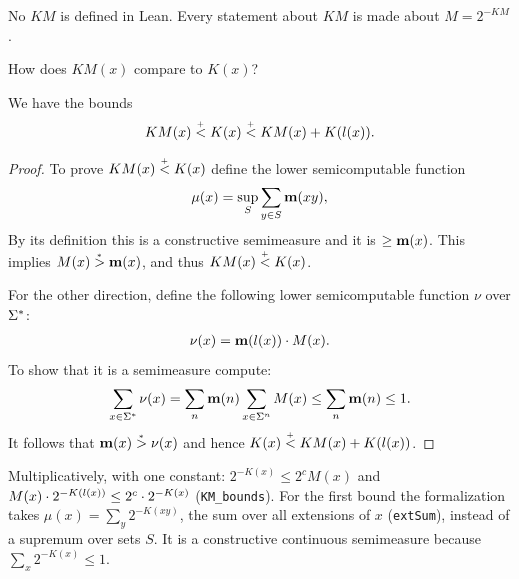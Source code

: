 \begin{formalization}
No \( KM \) is defined in Lean. Every statement about \( KM \) is made about
\( M = 2^{-KM} \).
\end{formalization}

How does \( KM(x) \) compare to \( K(x) \)?

\begin{proposition}\label{prop:KmHCompare}
  \leanok
We have the bounds
 \begin{align*}
 KM(x) \stackrel{{}_+}{<} K(x) \stackrel{{}_+}{<} KM(x) + K(l(x)).
 \end{align*}
\end{proposition}
\begin{proof}
  \leanok
To prove \( KM(x)\stackrel{{}_+}{<} K(x) \) define the lower semicomputable function
 \begin{align*}
   \mu(x) = \sup_{S}\sum_{y\in S}\mathbf{m}(xy),
 \end{align*}
By its definition this is a constructive semimeasure and it is
\( \ge \mathbf{m}(x) \).
This implies \( M(x)\stackrel{{}_*}{>} \mathbf{m}(x) \), and thus \( KM(x)\stackrel{{}_+}{<} K(x) \).

For the other direction, define the following lower semicomputable function \( \nu \)
over \( \Sigma^{*} \):
 \begin{align*}
   \nu(x)=\mathbf{m}(l(x))\cdot M(x).
 \end{align*}
To show that it is a semimeasure compute:
 \begin{align*}
   \sum_{x\in\Sigma^{*}}\nu(x)=\sum_{n}\mathbf{m}(n)\sum_{x\in\Sigma^{n}}M(x)\le\sum_{n}\mathbf{m}(n)\le 1.
 \end{align*}
It follows that \( \mathbf{m}(x)\stackrel{{}_*}{>}\nu(x) \) and hence \( K(x) \stackrel{{}_+}{<} KM(x)+K(l(x)) \).
\end{proof}

\begin{formalization}
Multiplicatively, with one constant: \( 2^{-K(x)} \le 2^{c} M(x) \) and
\( M(x) \cdot 2^{-K(l(x))} \le 2^{c} \cdot 2^{-K(x)} \) (\texttt{KM\_bounds}). For the first
bound the formalization takes \( \mu(x) = \sum_{y} 2^{-K(xy)} \), the sum over all
extensions of \( x \) (\texttt{extSum}), instead of a supremum over sets \( S \). It is a
constructive continuous semimeasure because \( \sum_{x} 2^{-K(x)} \le 1 \).
\end{formalization}


